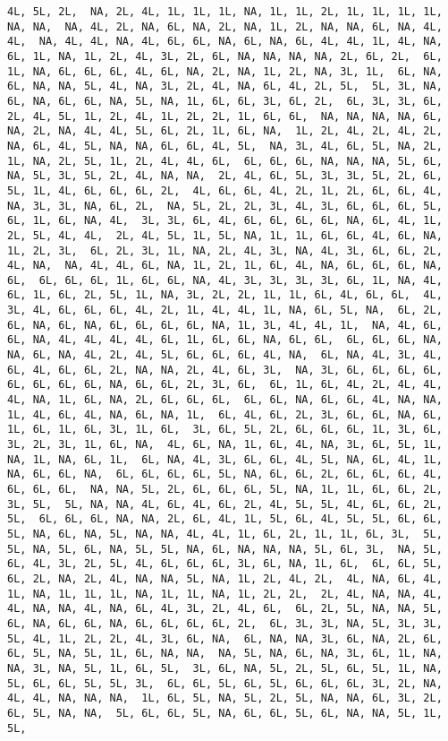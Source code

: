 \documentclass[
]{article}
\begin{document}
\begin{verbatim}
4L, 5L, 2L,  NA, 2L, 4L, 1L, 1L, 1L, NA, 1L, 1L, 2L, 1L, 1L, 1L, 1L, NA, NA,  NA, 4L, 2L, NA, 6L, NA, 2L, NA, 1L, 2L, NA, NA, 6L, NA, 4L, 4L,  NA, 4L, 4L, NA, 4L, 6L, 6L, NA, 6L, NA, 6L, 4L, 4L, 1L, 4L, NA,  6L, 1L, NA, 1L, 2L, 4L, 3L, 2L, 6L, NA, NA, NA, NA, 2L, 6L, 2L,  6L, 1L, NA, 6L, 6L, 6L, 4L, 6L, NA, 2L, NA, 1L, 2L, NA, 3L, 1L,  6L, NA, 6L, NA, NA, 5L, 4L, NA, 3L, 2L, 4L, NA, 6L, 4L, 2L, 5L,  5L, 3L, NA, 6L, NA, 6L, 6L, NA, 5L, NA, 1L, 6L, 6L, 3L, 6L, 2L,  6L, 3L, 3L, 6L, 2L, 4L, 5L, 1L, 2L, 4L, 1L, 2L, 2L, 1L, 6L, 6L,  NA, NA, NA, NA, 6L, NA, 2L, NA, 4L, 4L, 5L, 6L, 2L, 1L, 6L, NA,  1L, 2L, 4L, 2L, 4L, 2L, NA, 6L, 4L, 5L, NA, NA, 6L, 6L, 4L, 5L,  NA, 3L, 4L, 6L, 5L, NA, 2L, 1L, NA, 2L, 5L, 1L, 2L, 4L, 4L, 6L,  6L, 6L, 6L, NA, NA, NA, 5L, 6L, NA, 5L, 3L, 5L, 2L, 4L, NA, NA,  2L, 4L, 6L, 5L, 3L, 3L, 5L, 2L, 6L, 5L, 1L, 4L, 6L, 6L, 6L, 2L,  4L, 6L, 6L, 4L, 2L, 1L, 2L, 6L, 6L, 4L, NA, 3L, 3L, NA, 6L, 2L,  NA, 5L, 2L, 2L, 3L, 4L, 3L, 6L, 6L, 6L, 5L, 6L, 1L, 6L, NA, 4L,  3L, 3L, 6L, 4L, 6L, 6L, 6L, 6L, NA, 6L, 4L, 1L, 2L, 5L, 4L, 4L,  2L, 4L, 5L, 1L, 5L, NA, 1L, 1L, 6L, 6L, 4L, 6L, NA, 1L, 2L, 3L,  6L, 2L, 3L, 1L, NA, 2L, 4L, 3L, NA, 4L, 3L, 6L, 6L, 2L, 4L, NA,  NA, 4L, 4L, 6L, NA, 1L, 2L, 1L, 6L, 4L, NA, 6L, 6L, 6L, NA, 6L,  6L, 6L, 6L, 1L, 6L, 6L, NA, 4L, 3L, 3L, 3L, 3L, 6L, 1L, NA, 4L,  6L, 1L, 6L, 2L, 5L, 1L, NA, 3L, 2L, 2L, 1L, 1L, 6L, 4L, 6L, 6L,  4L, 3L, 4L, 6L, 6L, 6L, 4L, 2L, 1L, 4L, 4L, 1L, NA, 6L, 5L, NA,  6L, 2L, 6L, NA, 6L, NA, 6L, 6L, 6L, 6L, NA, 1L, 3L, 4L, 4L, 1L,  NA, 4L, 6L, 6L, NA, 4L, 4L, 4L, 4L, 6L, 1L, 6L, 6L, NA, 6L, 6L,  6L, 6L, 6L, NA, NA, 6L, NA, 4L, 2L, 4L, 5L, 6L, 6L, 6L, 4L, NA,  6L, NA, 4L, 3L, 4L, 6L, 4L, 6L, 6L, 2L, NA, NA, 2L, 4L, 6L, 3L,  NA, 3L, 6L, 6L, 6L, 6L, 6L, 6L, 6L, 6L, NA, 6L, 6L, 2L, 3L, 6L,  6L, 1L, 6L, 4L, 2L, 4L, 4L, 4L, NA, 1L, 6L, NA, 2L, 6L, 6L, 6L,  6L, 6L, NA, 6L, 6L, 4L, NA, NA, 1L, 4L, 6L, 4L, NA, 6L, NA, 1L,  6L, 4L, 6L, 2L, 3L, 6L, 6L, NA, 6L, 1L, 6L, 1L, 6L, 3L, 1L, 6L,  3L, 6L, 5L, 2L, 6L, 6L, 6L, 1L, 3L, 6L, 3L, 2L, 3L, 1L, 6L, NA,  4L, 6L, NA, 1L, 6L, 4L, NA, 3L, 6L, 5L, 1L, NA, 1L, NA, 6L, 1L,  6L, NA, 4L, 3L, 6L, 6L, 4L, 5L, NA, 6L, 4L, 1L, NA, 6L, 6L, NA,  6L, 6L, 6L, 6L, 5L, NA, 6L, 6L, 2L, 6L, 6L, 6L, 4L, 6L, 6L, 6L,  NA, NA, 5L, 2L, 6L, 6L, 6L, 5L, NA, 1L, 1L, 6L, 6L, 2L, 3L, 5L,  5L, NA, NA, 4L, 6L, 4L, 6L, 2L, 4L, 5L, 5L, 4L, 6L, 6L, 2L, 5L,  6L, 6L, 6L, NA, NA, 2L, 6L, 4L, 1L, 5L, 6L, 4L, 5L, 5L, 6L, 6L,  5L, NA, 6L, NA, 5L, NA, NA, 4L, 4L, 1L, 6L, 2L, 1L, 1L, 6L, 3L,  5L, 5L, NA, 5L, 6L, NA, 5L, 5L, NA, 6L, NA, NA, NA, 5L, 6L, 3L,  NA, 5L, 6L, 4L, 3L, 2L, 5L, 4L, 6L, 6L, 6L, 3L, 6L, NA, 1L, 6L,  6L, 6L, 5L, 6L, 2L, NA, 2L, 4L, NA, NA, 5L, NA, 1L, 2L, 4L, 2L,  4L, NA, 6L, 4L, 1L, NA, 1L, 1L, 1L, NA, 1L, 1L, NA, 1L, 2L, 2L,  2L, 4L, NA, NA, 4L, 4L, NA, NA, 4L, NA, 6L, 4L, 3L, 2L, 4L, 6L,  6L, 2L, 5L, NA, NA, 5L, 6L, NA, 6L, 6L, NA, 6L, 6L, 6L, 6L, 2L,  6L, 3L, 3L, NA, 5L, 3L, 3L, 5L, 4L, 1L, 2L, 2L, 4L, 3L, 6L, NA,  6L, NA, NA, 3L, 6L, NA, 2L, 6L, 6L, 5L, NA, 5L, 1L, 6L, NA, NA,  NA, 5L, NA, 6L, NA, 3L, 6L, 1L, NA, NA, 3L, NA, 5L, 1L, 6L, 5L,  3L, 6L, NA, 5L, 2L, 5L, 6L, 5L, 1L, NA, 5L, 6L, 6L, 5L, 5L, 3L,  6L, 6L, 5L, 6L, 5L, 6L, 6L, 6L, 3L, 2L, NA, 4L, 4L, NA, NA, NA,  1L, 6L, 5L, NA, 5L, 2L, 5L, NA, NA, 6L, 3L, 2L, 6L, 5L, NA, NA,  5L, 6L, 6L, 5L, NA, 6L, 6L, 5L, 6L, NA, NA, 5L, 1L, 5L, 
\end{verbatim}
\end{document}
